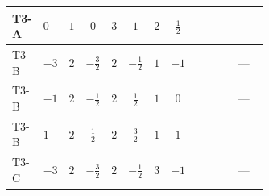 \documentclass[8pt]{article}
\begin{document}
\begin{landscape}
\begin{longtable}{@{}llcccccc >{\raggedright\arraybackslash}p{0.21\linewidth} >{\raggedright\arraybackslash}p{0.21\linewidth} >{\raggedright\arraybackslash}p{0.21\linewidth}@{}}
\midrule
T3-A & $0$ & $1$ & $0$ & $3$ & $1$ & $2$ & $\frac{1}{2}$ & \scriptsize\adjustbox{max width=\linewidth}{$\begin{gathered} +4 {\lambda_{HS_2}^{(1)}}^2\end{gathered}$} & \scriptsize\adjustbox{max width=\linewidth}{$\begin{gathered} +8 {\lambda_{HS_2}^{(1)}} {\lambda_{S_2}^{(1)}}\end{gathered}$} & \scriptsize\adjustbox{max width=\linewidth}{$\begin{gathered} +6 {\lambda_{HS_2}^{(A)}}^2\end{gathered}$} \\
\midrule
T3-B & $-3$ & $2$ & $-\frac{3}{2}$ & $2$ & $-\frac{1}{2}$ & $1$ & $-1$ & \scriptsize\adjustbox{max width=\linewidth}{$\begin{gathered} +4 {\lambda_{HS_2}^{(1)}}^2\end{gathered}$} & \scriptsize\adjustbox{max width=\linewidth}{$\begin{gathered} +6 {\lambda_{HS_2}^{(1)}} {\lambda_{S_2}^{(1)}}\end{gathered}$} & --- \\
\midrule
T3-B & $-1$ & $2$ & $-\frac{1}{2}$ & $2$ & $\frac{1}{2}$ & $1$ & $0$ & \scriptsize\adjustbox{max width=\linewidth}{$\begin{gathered} +4 {\lambda_{HS_2}^{(1)}}^2\end{gathered}$} & \scriptsize\adjustbox{max width=\linewidth}{$\begin{gathered} +6 {\lambda_{HS_2}^{(1)}} {\lambda_{S_2}^{(1)}}\end{gathered}$} & --- \\
\midrule
T3-B & $1$ & $2$ & $\frac{1}{2}$ & $2$ & $\frac{3}{2}$ & $1$ & $1$ & \scriptsize\adjustbox{max width=\linewidth}{$\begin{gathered} +4 {\lambda_{HS_2}^{(1)}}^2\end{gathered}$} & \scriptsize\adjustbox{max width=\linewidth}{$\begin{gathered} +6 {\lambda_{HS_2}^{(1)}} {\lambda_{S_2}^{(1)}}\end{gathered}$} & --- \\
\midrule
T3-C & $-3$ & $2$ & $-\frac{3}{2}$ & $2$ & $-\frac{1}{2}$ & $3$ & $-1$ & \scriptsize\adjustbox{max width=\linewidth}{$\begin{gathered} +4 {\lambda_{HS_2}^{(1)}}^2\end{gathered}$} & \scriptsize\adjustbox{max width=\linewidth}{$\begin{gathered} +6 {\lambda_{HS_2}^{(1)}} {\lambda_{S_2}^{(1)}}\end{gathered}$} & --- \\

\end{longtable}
\end{landscape}
\end{document}
